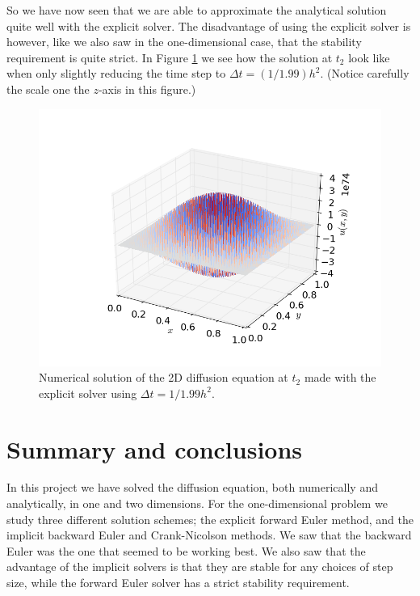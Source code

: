 \documentclass[12pt, a4paper]{article}
\begin{document}
So we have now seen that we are able to approximate the analytical solution quite well with the 
explicit solver. The disadvantage of using the explicit solver is however, like we also saw in the 
one-dimensional case, that the stability requirement is quite strict. In Figure \ref{fig:2d_us} we 
see how the solution at $t_2$ look like when only slightly reducing the time step to 
$\Delta t = (1/1.99) h^2$. (Notice carefully the scale one the $z$-axis in this figure.) 

\begin{figure}
\begin{center}
\includegraphics[scale=0.5]{../Programs/Output/Diffusion_2d_t2_us.png}
\caption{Numerical solution of the 2D diffusion equation at $t_2$ made with the explicit solver using 
$\Delta t = 1/1.99 h^2$.}
\label{fig:2d_us}
\end{center}
\end{figure}

\section{Summary and conclusions}

In this project we have solved the diffusion equation, both numerically and analytically, in one and 
two dimensions. For the one-dimensional problem we study three different solution schemes; the 
explicit forward Euler method, and the implicit backward Euler and Crank-Nicolson methods. We saw that 
the backward Euler was the one that seemed to be working best. We also saw that the advantage of the 
implicit solvers is that they are stable for any choices of step size, while the forward Euler solver 
has a strict stability requirement. 
\end{document}
